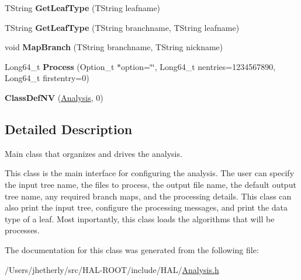 \begin{DoxyCompactItemize}
\item 
\hypertarget{class_h_a_l_1_1_analysis_a0ec08d57790b889e20df8c0076b89858}{T\+String {\bfseries Get\+Leaf\+Type} (T\+String leafname)}\label{class_h_a_l_1_1_analysis_a0ec08d57790b889e20df8c0076b89858}

\item 
\hypertarget{class_h_a_l_1_1_analysis_af4078713adc278e90495f61fa8759b83}{T\+String {\bfseries Get\+Leaf\+Type} (T\+String branchname, T\+String leafname)}\label{class_h_a_l_1_1_analysis_af4078713adc278e90495f61fa8759b83}

\item 
\hypertarget{class_h_a_l_1_1_analysis_a6e11fa65e712377587ed4b6a1a62c8aa}{void {\bfseries Map\+Branch} (T\+String branchname, T\+String nickname)}\label{class_h_a_l_1_1_analysis_a6e11fa65e712377587ed4b6a1a62c8aa}

\item 
\hypertarget{class_h_a_l_1_1_analysis_a4278a2e961076913371dec71da389701}{Long64\+\_\+t {\bfseries Process} (Option\+\_\+t $\ast$option=\char`\"{}\char`\"{}, Long64\+\_\+t nentries=1234567890, Long64\+\_\+t firstentry=0)}\label{class_h_a_l_1_1_analysis_a4278a2e961076913371dec71da389701}

\item 
\hypertarget{class_h_a_l_1_1_analysis_a93329a47d272937c655b41a414ff307e}{{\bfseries Class\+Def\+N\+V} (\hyperlink{class_h_a_l_1_1_analysis}{Analysis}, 0)}\label{class_h_a_l_1_1_analysis_a93329a47d272937c655b41a414ff307e}

\end{DoxyCompactItemize}


\subsection{Detailed Description}
Main class that organizes and drives the analysis. 

This class is the main interface for configuring the analysis. The user can specify the input tree name, the files to process, the output file name, the default output tree name, any required branch maps, and the processing details. This class can also print the input tree, configure the processing messages, and print the data type of a leaf. Most inportantly, this class loads the algorithms that will be processes. 

The documentation for this class was generated from the following file\+:\begin{DoxyCompactItemize}
\item 
/\+Users/jhetherly/src/\+H\+A\+L-\/\+R\+O\+O\+T/include/\+H\+A\+L/\hyperlink{_analysis_8h}{Analysis.\+h}\end{DoxyCompactItemize}
